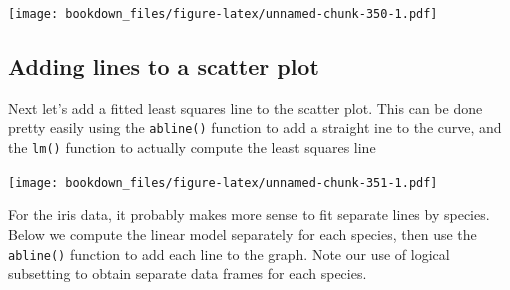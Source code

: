 \documentclass[]{krantz}
\makeatletter
\newenvironment{Shaded}{\begin{snugshade}}{\end{snugshade}}
\newcommand{\KeywordTok}[1]{\textcolor[rgb]{0.27,0.27,0.27}{\textbf{#1}}}
\newcommand{\DataTypeTok}[1]{\textcolor[rgb]{0.27,0.27,0.27}{#1}}
\newcommand{\DecValTok}[1]{\textcolor[rgb]{0.06,0.06,0.06}{#1}}
\newcommand{\FloatTok}[1]{\textcolor[rgb]{0.06,0.06,0.06}{#1}}
\newcommand{\StringTok}[1]{\textcolor[rgb]{0.5,0.5,0.5}{#1}}
\newcommand{\OperatorTok}[1]{\textcolor[rgb]{0.43,0.43,0.43}{\textbf{#1}}}
\newcommand{\NormalTok}[1]{#1}
\newenvironment{kframe}{%
\medskip{}
\setlength{\fboxsep}{.8em}
 \def\at@end@of@kframe{}%
 \ifinner\ifhmode%
  \def\at@end@of@kframe{\end{minipage}}%
  \begin{minipage}{\columnwidth}%
 \fi\fi%
 \def\FrameCommand##1{\hskip\@totalleftmargin \hskip-\fboxsep
 \colorbox{shadecolor}{##1}\hskip-\fboxsep
     \hskip-\linewidth \hskip-\@totalleftmargin \hskip\columnwidth}%
 \MakeFramed {\advance\hsize-\width
   \@totalleftmargin\z@ \linewidth\hsize
   \@setminipage}}%
 {\par\unskip\endMakeFramed%
 \at@end@of@kframe}
\renewenvironment{Shaded}{\begin{kframe}}{\end{kframe}}
\makeatother
\begin{document}
\texttt{[image: bookdown\_files/figure-latex/unnamed-chunk-350-1.pdf]}

\subsection{Adding lines to a scatter
plot}\label{adding-lines-to-a-scatter-plot-1}

Next let's add a fitted least squares line to the scatter plot. This can
be done pretty easily using the \texttt{abline()} function to add a
straight ine to the curve, and the \texttt{lm()} function to actually
compute the least squares line

\begin{Shaded}
\end{Shaded}

\texttt{[image: bookdown\_files/figure-latex/unnamed-chunk-351-1.pdf]}

For the iris data, it probably makes more sense to fit separate lines by
species. Below we compute the linear model separately for each species,
then use the \texttt{abline()} function to add each line to the graph.
Note our use of logical subsetting to obtain separate data frames for
each species.
\end{document}

